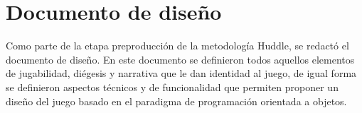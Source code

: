 \section{Documento de diseño}
Como parte de la etapa preproducción de la metodología Huddle, se redactó el documento de diseño. En este documento se definieron todos aquellos elementos de jugabilidad, diégesis y narrativa que le dan identidad al juego, de igual forma se definieron aspectos técnicos y de funcionalidad que permiten proponer un diseño del juego basado en el paradigma de programación orientada a objetos.




 





